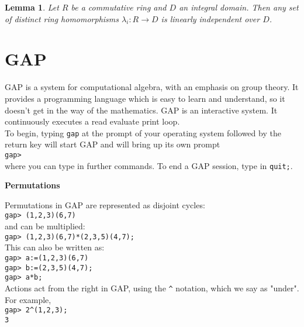 \documentclass[12pt]{amsart}
\newtheorem{lemma}[theorem]{Lemma}
\theoremstyle{definition}
\begin{document}
\begin{lemma}
Let $R$ be a commutative ring and $D$ an integral domain.  Then any set of distinct ring homomorphisms $\lambda_i:R\rightarrow D$ is linearly independent over $D$.
\end{lemma}

\section{GAP}
GAP is a system for computational algebra, with an emphasis on group theory.  It provides a programming language which is easy to learn and understand, so it doesn't get in the way of the mathematics.  GAP is an interactive system. It continuously executes a read evaluate print loop.\\

To begin, typing \verb"gap" at the prompt of your operating system followed by the return key will start GAP and will bring up its own prompt\\
\verb"gap>"\\
where you can type in further commands.  To end a GAP session, type in \verb"quit;".

\begin{center}
\textbf{Permutations}
\end{center}

Permutations in GAP are represented as disjoint cycles:\\
\verb"gap> (1,2,3)(6,7)"\\
and can be multiplied:\\
\verb"gap> (1,2,3)(6,7)*(2,3,5)(4,7);"\\
This can also be written as:\\
\verb"gap> a:=(1,2,3)(6,7)"\\
\verb"gap> b:=(2,3,5)(4,7);"\\
\verb"gap> a*b;"\\

Actions act from the right in GAP, using the \verb"^" notation, which we say as "under".  For example,\\
\verb"gap> 2^(1,2,3);"\\
\verb"3"\\
\end{document}
